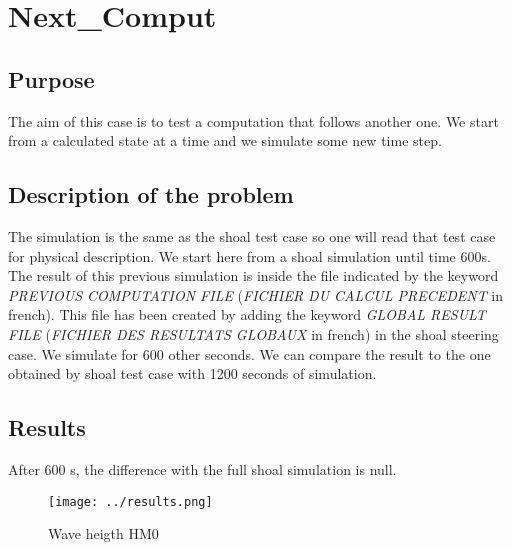 \section{Next\_Comput}

\subsection{Purpose}
%
The aim of this case is to test a computation that follows another one. We start from a calculated state at a time and we simulate some new time step.
%
\subsection{Description of the problem}
%
The simulation is the same as the shoal test case so one will read that test case for physical description. We start here from a shoal simulation until time 600s. The result of this previous simulation is inside the file indicated by the keyword {\it PREVIOUS COMPUTATION FILE} ({\it FICHIER DU CALCUL PRECEDENT} in french). This file has been created by adding the keyword  {\it GLOBAL RESULT FILE} ({\it FICHIER DES RESULTATS GLOBAUX} in french) in the shoal steering case.
We simulate for 600 other seconds. We can compare the result to the one obtained by shoal test case with 1200 seconds of simulation.

\subsection{Results}
After 600 s, the difference with the full shoal simulation is null.
\begin{figure} [!h]
\centering
\texttt{[image: ../results.png]}
 \caption{Wave heigth HM0}
\label{resnextcomp}
\end{figure}

